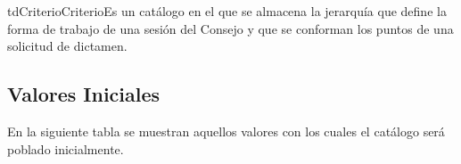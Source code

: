 	\begin{TipoDeDato}{tdCriterio}{Criterio}{Es un catálogo en el que se almacena la jerarquía que define la forma de trabajo de una sesión del Consejo y que se conforman los puntos de una solicitud de dictamen.}
		\begin{tdAtributos}	
		\end{tdAtributos}
		
		 \subsection{Valores Iniciales}
		En la siguiente tabla se muestran aquellos valores con los cuales el catálogo será poblado inicialmente.\cdtEmpty
	

\end{TipoDeDato}
